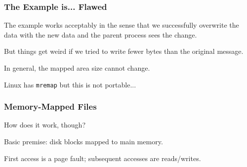 \begin{frame}
	\frametitle{The Example is... Flawed}

	The example works acceptably in the sense that we successfully overwrite the data with the new data and the parent process sees the change.

	But things get weird if we tried to write fewer bytes than the original message.

	In general, the mapped area size cannot change.

	Linux has \texttt{mremap} but this is not portable...

\end{frame}

\begin{frame}
\frametitle{Memory-Mapped Files}

How does it work, though?

Basic premise: disk blocks mapped to main memory.

First access is a page fault; subsequent accesses are reads/writes.

\end{frame}






